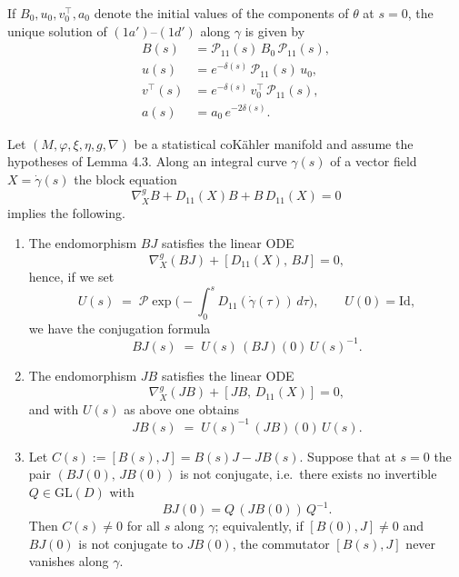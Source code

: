 If $B_0, u_0, v_0^\top, a_0$ denote the initial values of the components of $\theta$ at $s=0$, the unique solution of \((1a')\)–\((1d')\) along $\gamma$ is given by
\begin{align}
B(s) &= \mathcal{P}_{11}(s)\,B_0\,\mathcal{P}_{11}(s), \tag{A} \\
u(s) &= e^{-\delta(s)}\,\mathcal{P}_{11}(s)\,u_0, \tag{B} \\
v^\top(s) &= e^{-\delta(s)}\,v_0^\top\,\mathcal{P}_{11}(s), \tag{C} \\
a(s) &= a_0\,e^{-2\delta(s)}. \tag{D}
\end{align}
\begin{lem}
Let $(M,\varphi,\xi,\eta,g,\nabla)$ be a statistical coK\"ahler manifold and
assume the hypotheses of Lemma 4.3. Along an integral curve $\gamma(s)$ of a vector field $X=\dot\gamma(s)$ the block equation
\begin{equation}\tag{$1a'$}
\nabla^g_X B + D_{11}(X)B + B\,D_{11}(X) = 0
\end{equation}
implies the following.

\begin{enumerate}
\item The endomorphism $BJ$ satisfies the linear ODE
\[
\nabla^g_X(BJ) + [D_{11}(X),\,BJ] = 0,
\]
hence, if we set
\[
U(s) \;=\; \mathcal P\!\exp\!\Big(-\int_0^s D_{11}(\dot\gamma(\tau))\,d\tau\Big),
\qquad U(0)=\mathrm{Id},
\]
we have the conjugation formula
\[
BJ(s) \;=\; U(s)\, (BJ)(0)\, U(s)^{-1}.
\]

\item The endomorphism $JB$ satisfies the linear ODE
\[
\nabla^g_X(JB) + [JB,\,D_{11}(X)] = 0,
\]
and with $U(s)$ as above one obtains
\[
JB(s) \;=\; U(s)^{-1}\, (JB)(0)\, U(s).
\]

\item Let $C(s):=[B(s),J]=B(s)J-JB(s)$. Suppose that at $s=0$ the pair
$(BJ(0),\,JB(0))$ is not conjugate, i.e.\ there exists no invertible
$Q\in\mathrm{GL}(D)$ with
\[
BJ(0)=Q\,(JB(0))\,Q^{-1}.
\]
Then $C(s)\neq 0$ for all $s$ along $\gamma$; equivalently, if $[B(0),J]\neq0$
and $BJ(0)$ is not conjugate to $JB(0)$, the commutator $[B(s),J]$ never
vanishes along $\gamma$.
\end{enumerate}
\end{lem}

